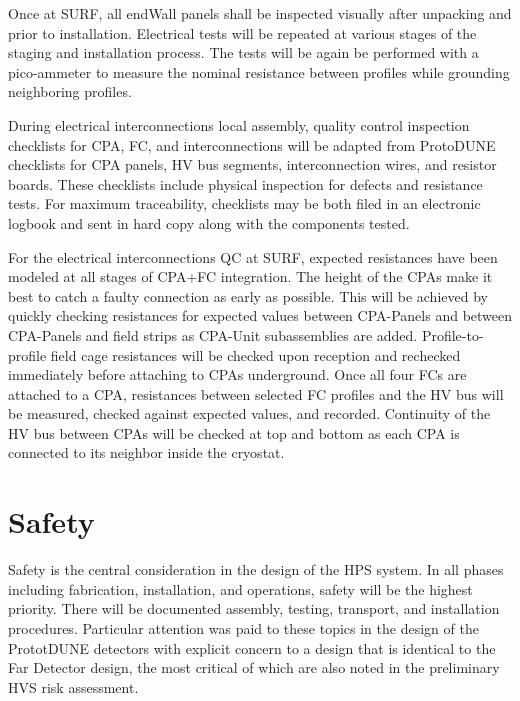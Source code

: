 
Once at SURF, all endWall panels shall be inspected visually after unpacking and prior to installation. Electrical tests will be repeated at various stages of the staging and installation process.
The tests will be again be performed with a pico-ammeter to measure the nominal resistance between profiles while grounding neighboring profiles.

During electrical interconnections local assembly, quality control inspection checklists for CPA, FC, and
interconnections will be adapted from ProtoDUNE checklists for CPA
panels, HV bus segments, interconnection wires, and resistor boards.
These checklists include physical inspection for defects and
resistance tests.  For maximum traceability, checklists may be both
filed in an electronic logbook and sent in hard copy along with the
components tested.

For the electrical interconnections QC at SURF, expected resistances have been modeled at all stages of
CPA+FC integration.  The height of the CPAs make it best to catch a
faulty connection as early as possible.  This will be achieved by
quickly checking resistances for expected values between CPA-Panels and between CPA-Panels and field strips as CPA-Unit subassemblies are added.  Profile-to-profile field cage resistances
will be checked upon reception and rechecked immediately before
attaching to CPAs underground.  Once all four FCs are attached to a
CPA, resistances between selected FC profiles and the HV bus will be
measured, checked against expected values, and recorded. Continuity of
the HV bus between CPAs will be checked at top and bottom as each CPA
is connected to its neighbor inside the cryostat.


\section{Safety}
\label{sec:fdsp-hv-safety}

Safety is the central consideration in the design of the HPS system. In all phases including fabrication, installation, and operations, safety will be the highest priority. There will be documented assembly, testing, transport, and installation procedures. Particular attention was paid to these topics in the design of the PrototDUNE detectors with explicit concern to a design that is identical to the Far Detector design, the most critical of which are also noted in the preliminary HVS risk assessment. 


